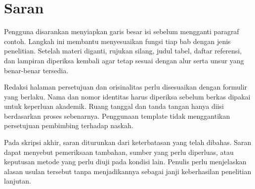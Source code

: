 \section{Saran}

Pengguna disarankan menyiapkan garis besar isi sebelum mengganti paragraf contoh. Langkah ini membantu menyesuaikan fungsi tiap bab dengan jenis penelitian. Setelah materi diganti, rujukan silang, judul tabel, daftar referensi, dan lampiran diperiksa kembali agar tetap sesuai dengan alur serta unsur yang benar-benar tersedia.

Redaksi halaman persetujuan dan orisinalitas perlu disesuaikan dengan formulir yang berlaku. Nama dan nomor identitas harus diperiksa sebelum berkas dipakai untuk keperluan akademik. Ruang tanggal dan tanda tangan hanya diisi berdasarkan proses sebenarnya. Penggunaan template tidak menggantikan persetujuan pembimbing terhadap naskah.

Pada skripsi akhir, saran diturunkan dari keterbatasan yang telah dibahas. Saran dapat menyebut pemeriksaan tambahan, sumber yang perlu diperluas, atau keputusan metode yang perlu diuji pada kondisi lain. Penulis perlu menjelaskan alasan usulan tersebut tanpa menjadikannya sebagai janji keberhasilan penelitian lanjutan.
